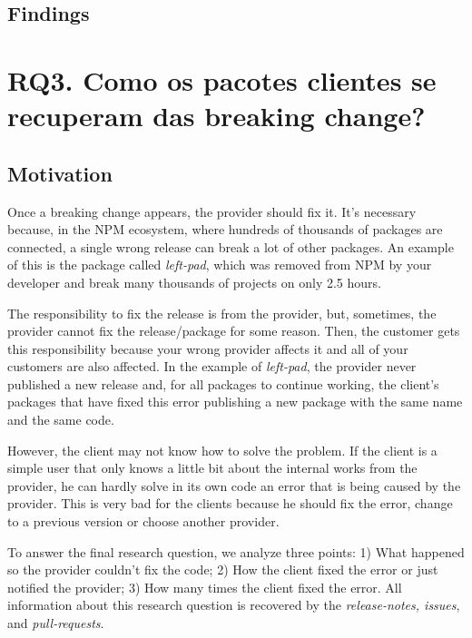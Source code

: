 \subsection{Findings}
\label{fin:rq2}

\section{RQ3. Como os pacotes clientes se recuperam das breaking change?}
\label{sec:rq3}

\subsection{Motivation}
\label{mot:rq3}

Once a breaking change appears, the provider should fix it. It’s necessary because, in the \Gls{NPM} ecosystem, where hundreds of thousands of packages are connected, a single wrong release can break a lot of other packages. An example of this is the package called \textit{left-pad}, which was removed from \Gls{NPM} by your developer and break many thousands of projects on only 2.5 hours.

The responsibility to fix the release is from the provider, but, sometimes, the provider cannot fix the release/package for some reason. Then, the customer gets this responsibility because your wrong provider affects it and all of your customers are also affected. In the example of \textit{left-pad}, the provider never published a new release and, for all packages to continue working, the client's packages that have fixed this error publishing a new package with the same name and the same code.

However, the client may not know how to solve the problem. If the client is a simple user that only knows a little bit about the internal works from the provider, he can hardly solve in its own code an error that is being caused by the provider. This is very bad for the clients because he should fix the error, change to a previous version or choose another provider.

To answer the final research question, we analyze three points: 1) What happened so the provider couldn't fix the code; 2) How the client fixed the error or just notified the provider; 3) How many times the client fixed the error. All information about this research question is recovered by the \textit{release-notes, issues}, and \textit{pull-requests}.

